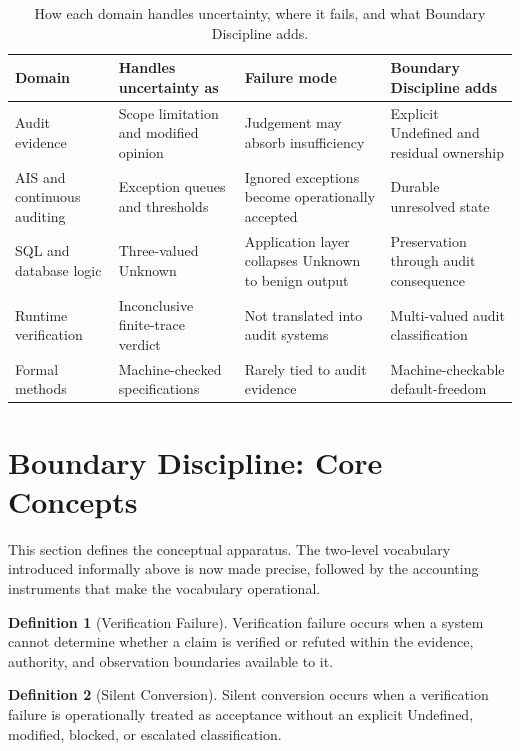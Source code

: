 \documentclass[11pt,a4paper]{article}
\theoremstyle{definition}
\newtheorem{definition}{Definition}[section]
\theoremstyle{remark}
\begin{document}
\begin{table}[htbp]
\centering
\small
\begin{tabular}{>{\raggedright\arraybackslash}p{2.6cm}>{\raggedright\arraybackslash}p{3.4cm}>{\raggedright\arraybackslash}p{3.6cm}>{\raggedright\arraybackslash}p{4.2cm}}
\toprule
\textbf{Domain} & \textbf{Handles uncertainty as} & \textbf{Failure mode} & \textbf{Boundary Discipline adds} \\
\midrule
Audit evidence & Scope limitation and modified opinion & Judgement may absorb insufficiency & Explicit \textsf{Undefined} and residual ownership \\
\addlinespace
AIS and continuous auditing & Exception queues and thresholds & Ignored exceptions become operationally accepted & Durable unresolved state \\
\addlinespace
SQL and database logic & Three-valued \textsf{Unknown} & Application layer collapses \textsf{Unknown} to benign output & Preservation through audit consequence \\
\addlinespace
Runtime verification & Inconclusive finite-trace verdict & Not translated into audit systems & Multi-valued audit classification \\
\addlinespace
Formal methods & Machine-checked specifications & Rarely tied to audit evidence & Machine-checkable default-freedom \\
\bottomrule
\end{tabular}
\caption{How each domain handles uncertainty, where it fails, and what Boundary Discipline adds.}
\label{tab:litmap}
\end{table}

\section{Boundary Discipline: Core Concepts}
\label{sec:concepts}

This section defines the conceptual apparatus. The two-level vocabulary introduced informally above is now made precise, followed by the accounting instruments that make the vocabulary operational.

\begin{definition}[Verification Failure]
\label{def:vfail}
Verification failure occurs when a system cannot determine whether a claim is verified or refuted within the evidence, authority, and observation boundaries available to it.
\end{definition}

\begin{definition}[Silent Conversion]
\label{def:silent}
Silent conversion occurs when a verification failure is operationally treated as acceptance without an explicit \textsf{Undefined}, modified, blocked, or escalated classification.
\end{definition}
\end{document}
